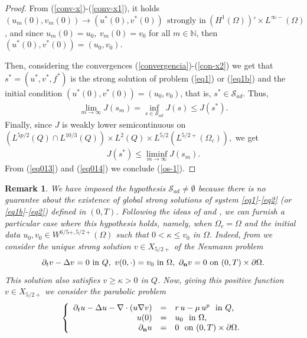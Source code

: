 \documentclass[11pt,reqno]{amsart}%
\newtheorem{remark}{Remark}[section]
\numberwithin{equation}{section}
\begin{document}
{\begin{proof}
From (\ref{conv-x})-(\ref{conv-x1}), it holds $(u_{m}(0),v_{m}(0))\rightarrow(u^*(0),v^*(0))\ \ \text{strongly in}\ 
(H^1(\Omega))' \times L^{\infty-}(\Omega)$,
and since $u_{m}(0)=u_0,\ v_{m}(0)=v_0$ for all $m\in\mathbb{N}$, then 
$(u^*(0),v^*(0))=(u_0,v_0).$ 

Then, considering the convergences (\ref{convergencia})-(\ref{con-x2}) we get that 
$s^*=(u^*,v^*,f^*)$ is the strong solution of problem  (\ref{eq1}) or  (\ref{eq1b}) and the initial condition $(u^*(0),v^*(0))=(u_0,v_0)$, that is, $s^*\in \mathcal{S}_{ad}.$ Thus, 
\begin{gather}\label{eq013}
    \lim_{m\to\infty}J(s_m)=\inf_{s\in \mathcal{S}_{ad}} J(s)\leq J(s^*).
\end{gather}
Finally, since $J$ is weakly lower semicontinuous on 
$\left(L^{5p/2}(Q)\!\cap L^{10/3}(Q)\right)\!\times L^2(Q) \times L^{5/2}(L^{5/2+}(\Omega_c)),$ we get 
\begin{gather}\label{eq014}
    J(s^*)\leq\liminf_{m\to\infty} J(s_m).
\end{gather}
From (\ref{eq013}) and (\ref{eq014}) we conclude (\ref{os-1}).
\end{proof}


\begin{remark}\label{R4-1}
We have imposed the hypothesis $\mathcal{S}_{ad}\ne\emptyset$ because there is no guarantee about the existence of global strong solutions of system \eqref{eq1}-\eqref{eq2} (or \eqref{eq1b}-\eqref{eq2}) defined in $(0,T)$. 
Following the ideas of \cite[Remark 6]{Exequiel3D} and \cite{Lopez}, we can furnish a particular case where this hypothesis holds, namely, when $\Omega_c=\Omega$ and the initial data 
$u_0, v_0 \in W^{6/5+,5/2+}(\Omega)$ such that $0<\kappa\le v_0$ in $\Omega$. Indeed, from \cite[Theorem 10.22]{feireisl} we consider the unique strong solution $ v\in X_{5/2+}$ of the Neumann problem 
$$
\partial_tv-\Delta v=0\mbox{ in }Q,\ v(0,\cdot)=v_0\mbox{ in }\Omega,\ {\partial}_{\bf n}v=0\mbox{ on } (0,T)\times\partial\Omega.
$$
This solution also satisfies $v\ge \kappa>0$ in $Q$. 
Now, giving this positive function $v\in X_{5/2+}$ we consider the parabolic problem 
\begin{equation}\label{nv-1}
\left\{
\begin{array}{rcl}
\partial_tu-\Delta u-\nabla\cdot(u\nabla v)&=&r\,u-\mu\, u^p\ \mbox{ in $Q$,}\\
u(0)&=&u_0\ \mbox{ in $\Omega$,}\\
\partial_{\bf n}u&=&0\ \mbox{ on $(0,T)\times\partial\Omega$.}
\end{array}
\right.
\end{equation}


\end{remark}}
\end{document}
